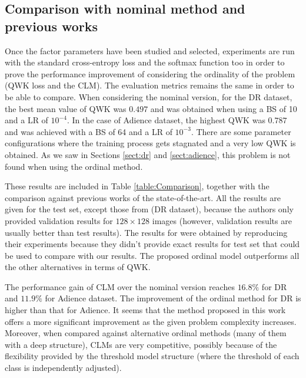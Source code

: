 \documentclass[journal]{IEEEtran}
\begin{document}
	\subsection{Comparison with nominal method and previous works}
	\label{sect:NominalComparison}
	Once the factor parameters have been studied and selected, experiments are run with the standard cross-entropy loss and the softmax function too in order to prove the performance improvement of considering the ordinality of the problem (QWK loss and the CLM). The evaluation metrics remains the same in order to be able to compare. When considering the nominal version, for the DR dataset, the best mean value of QWK was $0.497$ and was obtained when using a BS of 10 and a LR of $10^{-4}$. In the case of Adience dataset, the highest QWK was $0.787$ and was achieved with a BS of 64 and a LR of $10^{-3}$. There are some parameter configurations where the training process gets stagnated and a very low QWK is obtained. As we saw in Sections \ref{sect:dr} and \ref{sect:adience}, this problem is not found when using the ordinal method. 

	These results are included in Table \ref{table:Comparison}, together with the comparison against previous works of the state-of-the-art. All the results are given for the test set, except those from \cite{de2018weighted} (DR dataset), because the authors only provided validation results for $128\times 128$ images (however, validation results are usually better than test results). The results for \cite{beckham2017unimodal} were obtained by reproducing their experiments because they didn't provide exact results for test set that could be used to compare with our results. The proposed ordinal model outperforms all the other alternatives in terms of QWK. 
	
	The performance gain of CLM over the nominal version reaches $16.8\%$ for DR and $11.9\%$ for Adience dataset. The improvement of the ordinal method for DR is higher than that for Adience. It seems that the method proposed in this work offers a more significant improvement as the given problem complexity increases. Moreover, when compared against alternative ordinal methods (many of them with a deep structure), CLMs are very competitive, possibly because of the flexibility provided by the threshold model structure (where the threshold of each class is independently adjusted).
\end{document}
